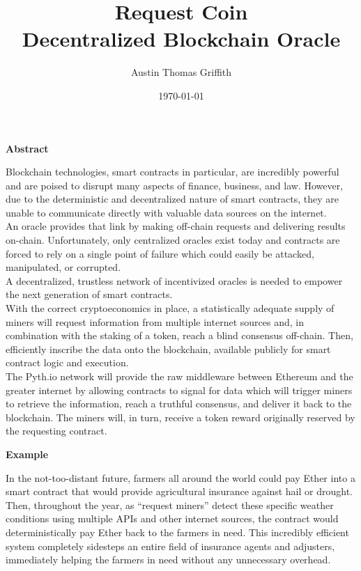 \documentclass[a4paper,10pt]{article}
\begin{document}
\title{%
  Request Coin \\
  \medbreak
  \small  Decentralized Blockchain Oracle\\
     }

\date{\today}
\author{Austin Thomas Griffith}
\maketitle


\begin{center}
\textbf{Abstract}
\end{center}
Blockchain technologies, smart contracts in particular, are incredibly powerful and are poised to disrupt many aspects of finance, business, and law. However, due to the deterministic and decentralized nature of smart contracts, they are unable to communicate directly with valuable data sources on the internet.\\

An oracle provides that link by making off-chain requests and delivering results on-chain. Unfortunately, only centralized oracles exist today and contracts are forced to rely on a single point of failure which could easily be attacked, manipulated, or corrupted.\\

A decentralized, trustless network of incentivized oracles is needed to empower the next generation of smart contracts.\\

With the correct cryptoeconomics in place, a statistically adequate supply of miners will request information from multiple internet sources and, in combination with the staking of a token, reach a blind consensus off-chain. Then, efficiently inscribe the data onto the blockchain, available publicly for smart contract logic and execution.\\

The Pyth.io network will provide the raw middleware between Ethereum and the greater internet by allowing contracts to signal for data which will trigger miners to retrieve the information, reach a truthful consensus, and deliver it back to the blockchain. The miners will, in turn, receive a token reward originally reserved by the requesting contract.\\


\begin{center}
\textbf{Example}
\end{center}

In the not-too-distant future, farmers all around the world could pay Ether into a smart contract that would provide agricultural insurance against hail or drought. Then, throughout the year, as “request miners” detect these specific weather conditions using multiple APIs and other internet sources, the contract would deterministically pay Ether back to the farmers in need. This incredibly efficient system completely sidesteps an entire field of insurance agents and adjusters, immediately helping the farmers in need without any unnecessary overhead.\\
\end{document}
